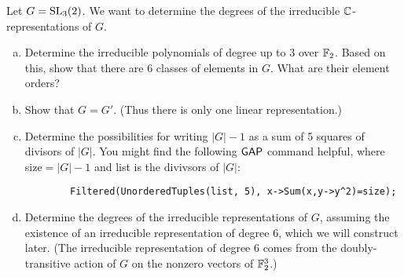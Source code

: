 \documentclass[leqno]{article}
\begin{document}
\newpage
\begin{problem} Let $G=\mathrm{SL}_3(2)$. We want to determine the degrees of the irreducible $\mathbb{C}$-representations of $G$.
\begin{enumerate}[(a)]
    \item Determine the irreducible polynomials of degree up to 3 over $\mathbb{F}_2$. Based on this, show that there are 6 classes of elements in $G$. What are their element orders?
    \item Show that $G=G'$. (Thus there is only one linear representation.)
    \item Determine the possibilities for writing $|G|-1$ as a sum of 5 squares of divisors of $|G|$. You might find the following ${\sf GAP}$ command helpful, where \textsf{size}$=|G|-1$ and \textsf{list} is the divivsors of $|G|$:
    \begin{verbatim}
        Filtered(UnorderedTuples(list, 5), x->Sum(x,y->y^2)=size);
    \end{verbatim}
    \item Determine the degrees of the irreducible representations of $G$, assuming the existence of an irreducible representation of degree 6, which we will construct later. (The irreducible representation of degree 6 comes from the doubly-transitive action of $G$ on the nonzero vectors of $\mathbb{F}_2^3$.)
\end{enumerate}
\end{problem}
\end{document}
